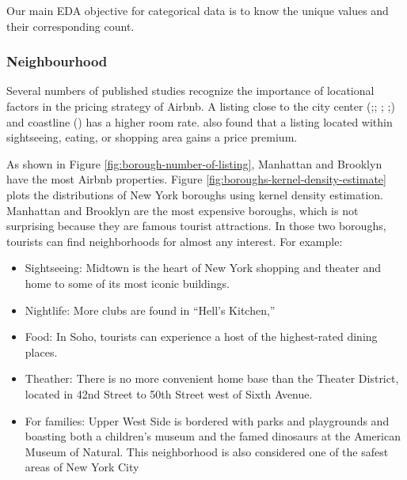 Our main EDA objective for categorical data is to know the unique values and
their corresponding count.

\subsubsection*{Neighbourhood}
\label{eda:neighbourhood}

Several numbers of published studies recognize the importance of locational
factors in the pricing strategy of Airbnb.  A listing close to the city center
(\cite{gibbs2018use};\cite{li2016pros}; \cite{wang2017price};
\cite{zhang2017key};\cite{gibbs2018use}) and coastline (\cite{perez2018and}) has
a higher room rate.  \cite{perez2018and} also found that a listing located
within sightseeing, eating, or shopping area gains a price premium.

As shown in Figure \ref{fig:borough-number-of-listing}, Manhattan and Brooklyn
have the most Airbnb properties.
Figure \ref{fig:boroughs-kernel-density-estimate} plots the distributions of New
York boroughs using kernel density estimation. Manhattan and Brooklyn are the most
expensive boroughs, which is not surprising because they are famous tourist
attractions.  In those two boroughs, tourists can find neighborhoods for almost
any interest. For example:

\begin{itemize}
  \item Sightseeing: Midtown is the heart of New York shopping and theater and
    home to some of its most iconic buildings.
  \item Nightlife:  More clubs are found in “Hell’s Kitchen,”
  \item Food: In Soho, tourists can experience a host of the highest-rated
    dining places.
  \item Theather: There is no more convenient home base than
    the Theater District,  located in 42nd Street to 50th Street west of Sixth
    Avenue.
  \item For families: Upper West Side is bordered with parks and playgrounds and
  boasting both a children’s museum and the famed dinosaurs at the American Museum
  of Natural. This neighborhood is also considered one of the safest areas of New
  York City
\end{itemize}


